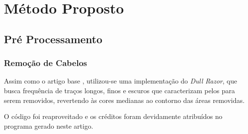\section{Método Proposto}

\subsection{Pré Processamento}

\subsubsection{Remoção de Cabelos}

Assim como o artigo base \cite{santos2020skin}, utilizou-se uma implementação do \emph{Dull Razor}\cite{dullRazorRepo}, que busca frequência de traços longos, finos e escuros que caracterizam pelos para serem removidos, revertendo às cores medianas ao contorno das áreas removidas.

O código foi reaproveitado e os créditos foram devidamente atribuídos no programa gerado neste artigo.
